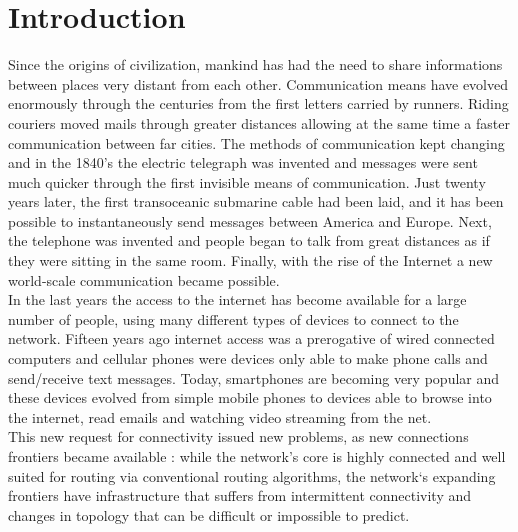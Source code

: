 
\chapter{Introduction}\label{introduzione} %





Since the origins of civilization, mankind has had the need to share informations between places very distant from each other. Communication means have evolved enormously through the centuries from the first letters carried by runners. Riding couriers moved mails through greater distances allowing at the same time a faster communication between far cities. The methods of communication kept changing and in the 1840's the electric telegraph was invented and messages were sent much quicker through the first invisible means of communication. Just twenty years later, the first transoceanic submarine cable had been laid, and it has been possible to instantaneously send messages between America and Europe. Next, the telephone was invented and people began to talk from great distances as if they were sitting in the same room. Finally, with the rise of the Internet a new world-scale communication became possible.
\\

In the last years the access to the internet has become available for a large number of people, using many different types of devices to connect to the network. Fifteen years ago internet access was a prerogative of wired connected computers and cellular phones were devices only able to make phone calls and send/receive text messages. Today, smartphones are becoming very popular and these devices evolved from simple mobile phones to devices able to browse into the internet, read emails and watching video streaming from the net.
\\

This new request for connectivity issued new problems, as new connections frontiers became available
: while the network's core is highly connected and well suited for routing via
conventional routing algorithms, the network‘s expanding frontiers have infrastructure
that suffers from intermittent connectivity and changes in topology that can be difficult
or impossible to predict.




